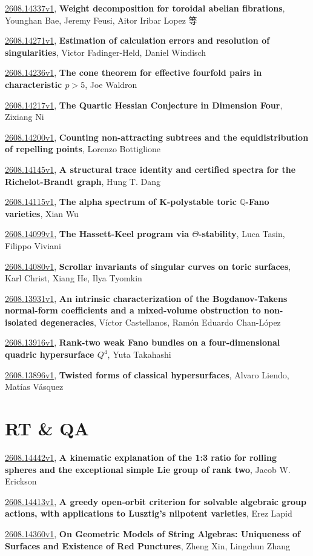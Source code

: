 \documentclass[9pt, a4paper]{article}
\theoremstyle{plain}
\theoremstyle{definition}
\theoremstyle{remark}
\newcommand{\arxiv}[3]{\href{https://arxiv.org/abs/#1}{#1}, \textbf{\textcolor{arxivblue}{#2}}, #3}
\begin{document}
\arxiv{2608.14337v1}{Weight decomposition for toroidal abelian fibrations}{Younghan Bae, Jeremy Feusi, Aitor Iribar Lopez 等}

\arxiv{2608.14271v1}{Estimation of calculation errors and resolution of singularities}{Victor Fadinger-Held, Daniel Windisch}

\arxiv{2608.14236v1}{The cone theorem for effective fourfold pairs in characteristic $p>5$}{Joe Waldron}

\arxiv{2608.14217v1}{The Quartic Hessian Conjecture in Dimension Four}{Zixiang Ni}

\arxiv{2608.14200v1}{Counting non-attracting subtrees and the equidistribution of repelling points}{Lorenzo Bottiglione}

\arxiv{2608.14145v1}{A structural trace identity and certified spectra for the Richelot-Brandt graph}{Hung T. Dang}

\arxiv{2608.14115v1}{The alpha spectrum of K-polystable toric $\mathbb{Q}$-Fano varieties}{Xian Wu}

\arxiv{2608.14099v1}{The Hassett-Keel program via $Θ$-stability}{Luca Tasin, Filippo Viviani}

\arxiv{2608.14080v1}{Scrollar invariants of singular curves on toric surfaces}{Karl Christ, Xiang He, Ilya Tyomkin}

\arxiv{2608.13931v1}{An intrinsic characterization of the Bogdanov-Takens normal-form coefficients and a mixed-volume obstruction to non-isolated degeneracies}{Víctor Castellanos, Ramón Eduardo Chan-López}

\arxiv{2608.13916v1}{Rank-two weak Fano bundles on a four-dimensional quadric hypersurface $Q^4$}{Yuta Takahashi}

\arxiv{2608.13896v1}{Twisted forms of classical hypersurfaces}{Alvaro Liendo, Matías Vásquez}


\section{RT \& QA}
\arxiv{2608.14442v1}{A kinematic explanation of the 1:3 ratio for rolling spheres and the exceptional simple Lie group of rank two}{Jacob W. Erickson}

\arxiv{2608.14413v1}{A greedy open-orbit criterion for solvable algebraic group actions, with applications to Lusztig's nilpotent varieties}{Erez Lapid}

\arxiv{2608.14360v1}{On Geometric Models of String Algebras: Uniqueness of Surfaces and Existence of Red Punctures}{Zheng Xin, Lingchun Zhang}
\end{document}
